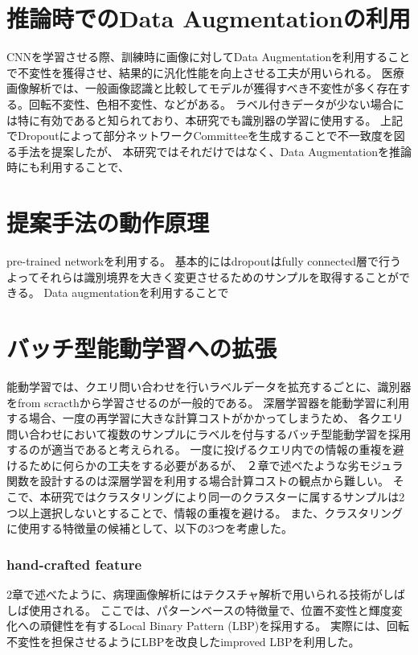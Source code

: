 \section{推論時でのData Augmentationの利用}
CNNを学習させる際、訓練時に画像に対してData Augmentationを利用することで不変性を獲得させ、結果的に汎化性能を向上させる工夫が用いられる。
医療画像解析では、一般画像認識と比較してモデルが獲得すべき不変性が多く存在する。回転不変性、色相不変性、などがある。
ラベル付きデータが少ない場合には特に有効であると知られており、本研究でも識別器の学習に使用する。
上記でDropoutによって部分ネットワークCommitteeを生成することで不一致度を図る手法を提案したが、
本研究ではそれだけではなく、Data Augmentationを推論時にも利用することで、

\section{提案手法の動作原理}
pre-trained networkを利用する。
基本的にはdropoutはfully connected層で行う
よってそれらは識別境界を大きく変更させるためのサンプルを取得することができる。
Data augmentationを利用することで

\section{バッチ型能動学習への拡張}
能動学習では、クエリ問い合わせを行いラベルデータを拡充するごとに、識別器をfrom scracthから学習させるのが一般的である。
深層学習器を能動学習に利用する場合、一度の再学習に大きな計算コストがかかってしまうため、
各クエリ問い合わせにおいて複数のサンプルにラベルを付与するバッチ型能動学習を採用するのが適当であると考えられる。
一度に投げるクエリ内での情報の重複を避けるために何らかの工夫をする必要があるが、
２章で述べたような劣モジュラ関数を設計するのは深層学習を利用する場合計算コストの観点から難しい。
そこで、本研究ではクラスタリングにより同一のクラスターに属するサンプルは2つ以上選択しないとすることで、情報の重複を避ける。
また、クラスタリングに使用する特徴量の候補として、以下の3つを考慮した。

\subsubsection{hand-crafted feature}
2章で述べたように、病理画像解析にはテクスチャ解析で用いられる技術がしばしば使用される。
ここでは、パターンベースの特徴量で、位置不変性と輝度変化への頑健性を有するLocal Binary Pattern (LBP)を採用する。
実際には、回転不変性を担保させるようにLBPを改良したimproved LBPを利用した。


